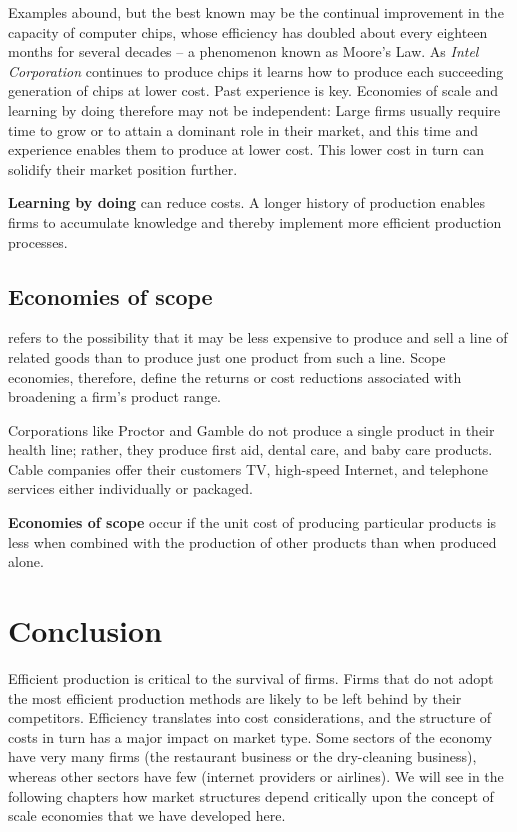 Examples abound, but the best known may be the continual improvement in the
capacity of computer chips, whose efficiency has doubled about every
eighteen months for several decades -- a phenomenon known as Moore's Law. As 
\textit{Intel Corporation} continues to produce chips it learns how to
produce each succeeding generation of chips at lower cost. Past experience
is key. Economies of scale and learning by doing therefore may not be
independent: Large firms usually require time to grow or to attain a
dominant role in their market, and this time and experience enables them to
produce at lower cost. This lower cost in turn can solidify their market
position further.

\begin{DefBox}
	\textbf{Learning by doing} can reduce costs. A longer history of production enables firms to accumulate knowledge and thereby implement more efficient production processes.
\end{DefBox}

\subsection*{Economies of scope}

 refers to the possibility that it may be
less expensive to produce and sell a line of related goods than to produce
just one product from such a line. Scope economies, therefore, define the
returns or cost reductions associated with broadening a firm's product range.

Corporations like Proctor and Gamble do not produce a single product in
their health line; rather, they produce first aid, dental care, and baby
care products. Cable companies offer their customers TV, high-speed
Internet, and telephone services either individually or packaged.

\begin{DefBox}
	\textbf{Economies of scope} occur if the unit cost of producing particular products is less when combined with the production of other products than when produced alone.
\end{DefBox}

\section*{Conclusion}

Efficient production is critical to the survival of firms. Firms that do not
adopt the most efficient production methods are likely to be left behind by
their competitors. Efficiency translates into cost considerations, and the
structure of costs in turn has a major impact on market type. Some sectors
of the economy have very many firms (the restaurant business
or the dry-cleaning business), whereas other sectors have few (internet
providers or airlines). We will see in the following chapters how market
structures depend critically upon the concept of scale economies that we
have developed here.